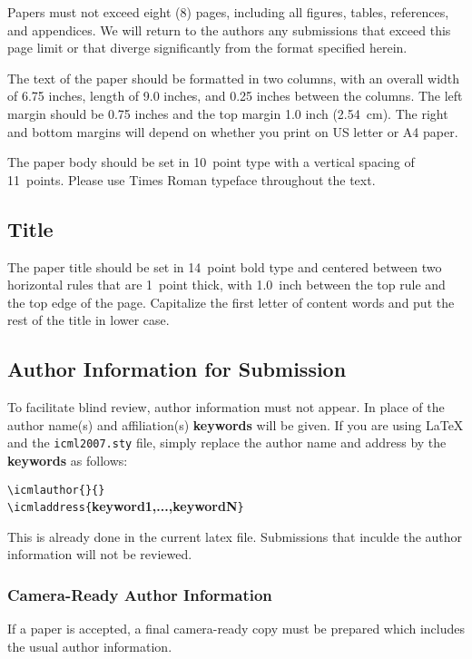\documentclass{article}
\begin{document}
Papers must not exceed eight (8) pages, including all figures, tables, 
references, and appendices. We will return to the authors any submissions
that exceed this page limit or that diverge significantly from the format 
specified herein.

The text of the paper should be formatted in two columns, with an
overall width of 6.75 inches, length of 9.0 inches, and 0.25 inches
between the columns. The left margin should be 0.75 inches and the top
margin 1.0 inch (2.54~cm). The right and bottom margins will depend on
whether you print on US letter or A4 paper. 

The paper body should be set in 10~point type with a vertical spacing of 
11~points. Please use Times Roman typeface throughout the text. 

\subsection{Title}

The paper title should be set in 14~point bold type and centered between 
two horizontal rules that are 1~point thick, with 1.0~inch between the
top rule and the top edge of the page. Capitalize the first letter of 
content words and put the rest of the title in lower case. 

\subsection{Author Information for Submission}
\label{author info}

To facilitate blind review, author information must not appear.
In place of the author name(s) and affiliation(s)
\textbf{keywords} will be given.
If you are using \LaTeX\/ and the \texttt{icml2007.sty} file,
simply replace the author name and address by the \textbf{keywords} 
as follows:

\verb+\icmlauthor{+\verb+}{}+\\
\verb+\icmladdress{+\textbf{keyword1,...,keywordN}\verb+}+

This is already done in the current latex file. 
Submissions that inculde the author information
will not be reviewed.

\subsubsection{Camera-Ready Author Information}
\label{final author}

If a paper is accepted, a final camera-ready copy must be prepared which
includes the usual author information.
\end{document}
